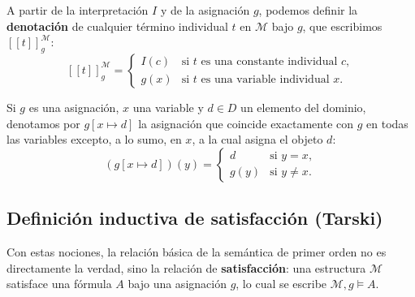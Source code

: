 \noindent A partir de la interpretación $I$ y de la asignación $g$, podemos definir la \textbf{denotación} de cualquier término individual $t$ en $\mathcal{M}$ bajo $g$, que escribimos $[\![t]\!]^\mathcal{M}_g$:
\[
[\![t]\!]^\mathcal{M}_g = \begin{cases}
I(c) & \text{si } t \text{ es una constante individual } c, \\
g(x) & \text{si } t \text{ es una variable individual } x.
\end{cases}
\]

\begin{definition}
Si $g$ es una asignación, $x$ una variable y $d \in D$ un elemento del dominio, denotamos por $g[x \mapsto d]$ la asignación que coincide exactamente con $g$ en todas las variables excepto, a lo sumo, en $x$, a la cual asigna el objeto $d$:
\[
(g[x \mapsto d])(y) = \begin{cases}
d & \text{si } y = x, \\
g(y) & \text{si } y \neq x.
\end{cases}
\]
\end{definition}

\subsection{Definición inductiva de satisfacción (Tarski)}

Con estas nociones, la relación básica de la semántica de primer orden no es directamente la verdad, sino la relación de \textbf{satisfacción}: una estructura $\mathcal{M}$ satisface una fórmula $A$ bajo una asignación $g$, lo cual se escribe $\mathcal{M}, g \models A$.

